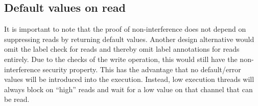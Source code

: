\documentclass[10pt,preprint]{sigplanconf}
\newcommand{\arrayStretch}{1.28}
\renewcommand{\t}[1]{~\text{#1}~}
\begin{document}





\subsection{Default values on read}
\label{s:default}

It is important to note that the proof of non-interference does not depend on suppressing reads by returning default values.  Another design alternative would omit the label check for reads and thereby omit label annotations for reads entirely.  Due to the checks of the write operation, this would still have the non-interference security property.  This has the advantage that no default/error values will be introduced into the execution.  Instead, low execution threads will always block on ``high'' reads and wait for a low value on that channel that can be read.
\end{document}

